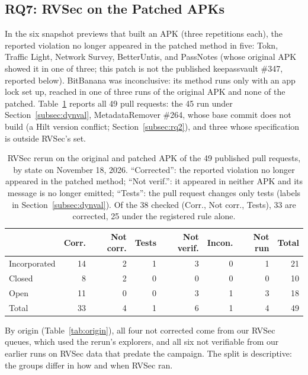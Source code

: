 \documentclass[conference]{IEEEtran}
\newcommand{\researchq}[1]{\textbf{RQ#1}}
\begin{document}
\subsection{\researchq{7}: RVSec on the Patched APKs}
\label{subsec:rq7}

In the six snapshot previews that built an APK (three repetitions each), the
reported violation no longer appeared in the patched method in five: Tokn,
Traffic Light, Network Survey, BetterUntis, and PassNotes (whose original APK
showed it in one of three; this patch is not the published keepassvault
\#347, reported below). BitBanana was inconclusive: its method runs only with
an app lock set up, reached in one of three runs of the original APK and none
of the patched. Table~\ref{tab:dynval} reports all 49 pull requests: the 45
run under Section~\ref{subsec:dynval}, MetadataRemover \#264, whose base
commit does not build (a Hilt version conflict; Section~\ref{subsec:rq2}), and three
whose specification is outside RVSec's set.

\begin{table}[H]
\centering
\caption{RVSec rerun on the original and patched APK of the 49 published pull
requests, by state on November 18, 2026. ``Corrected'': the reported violation
no longer appeared in the patched method; ``Not verif.'': it appeared in
neither APK and its message is no longer emitted; ``Tests'': the pull request
changes only tests (labels in Section~\ref{subsec:dynval}). Of the 38 checked
(Corr., Not corr., Tests), 33 are corrected, 25 under the registered rule
alone.}
\label{tab:dynval}
\footnotesize
\setlength{\tabcolsep}{3pt}
\begin{tabular}{lrrrrrrr}
\toprule
 & Corr. & Not corr. & Tests & Not verif. & Incon. & Not run & Total \\
\midrule
Incorporated & 14 & 2 & 1 & 3 & 0 & 1 & 21 \\
Closed       & 8 & 2 & 0 & 0 & 0 & 0 & 10 \\
Open         & 11 & 0 & 0 & 3 & 1 & 3 & 18 \\
\midrule
Total        & 33 & 4 & 1 & 6 & 1 & 4 & 49 \\
\bottomrule
\end{tabular}
\end{table}

By origin (Table~\ref{tab:origin}), all four not corrected come from our
RVSec queues, which used the rerun's explorers, and all six not verifiable
from our earlier runs on RVSec data that predate the campaign. The split is
descriptive: the groups differ in how and when RVSec ran.
\end{document}
